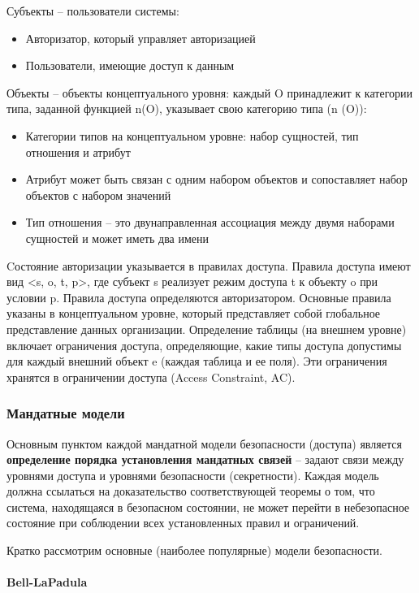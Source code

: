 Субъекты -- пользователи системы:
\begin{itemize}
    \item Авторизатор, который управляет авторизацией
    \item Пользователи, имеющие доступ к данным
\end{itemize}

Объекты -- объекты концептуального уровня: каждый O принадлежит к категории типа, заданной функцией n(O), 
указывает свою категорию типа (n (O)):
\begin{itemize}
    \item Категории типов на концептуальном уровне: набор сущностей, тип отношения и атрибут
    \item Атрибут может быть связан с одним набором объектов и сопоставляет набор объектов с набором значений
    \item Тип отношения -- это двунаправленная ассоциация между двумя наборами сущностей и может иметь два имени
\end{itemize}

Cостояние авторизации указывается в правилах доступа. Правила доступа имеют вид <s, o, t, p>, где субъект s 
реализует режим доступа t к объекту o при условии p. Правила доступа определяются авторизатором. Основные правила 
указаны в концептуальном уровне, который представляет собой глобальное представление данных организации. Определение 
таблицы (на внешнем уровне) включает ограничения доступа, определяющие, какие типы доступа допустимы для
каждый внешний объект e (каждая таблица и ее поля). Эти ограничения хранятся в ограничении доступа (Access Constraint, AC).

\subsubsection{Мандатные модели}

Основным пунктом каждой мандатной модели безопасности (доступа) является \textbf{определение порядка установления 
мандатных связей} -- задают связи между уровнями доступа и уровнями безопасности (секретности). Каждая модель 
должна ссылаться на доказательство соответствующей теоремы о том, что система, находящаяся в безопасном 
состоянии, не может перейти в небезопасное состояние при соблюдении всех установленных правил и ограничений.

Кратко рассмотрим основные (наиболее популярные) модели безопасности.

\paragraph{Bell-LaPadula}

